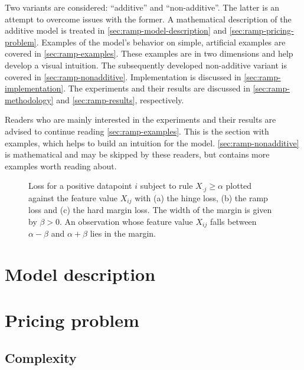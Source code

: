 Two variants are considered: ``additive'' and ``non-additive''.
The latter is an attempt to overcome issues with the former.
A mathematical description of the additive model is treated in
\autoref{sec:ramp-model-description} and \autoref{sec:ramp-pricing-problem}.
Examples of the model's behavior on simple, artificial examples are covered in \autoref{sec:ramp-examples}.
These examples are in two dimensions and help develop a visual intuition.
The subsequently developed non-additive variant is covered in \autoref{sec:ramp-nonadditive}.
Implementation is discussed in \autoref{sec:ramp-implementation}.
The experiments and their results are discussed
in \autoref{sec:ramp-methodology} and \autoref{sec:ramp-results}, respectively.

Readers who are mainly interested in the experiments and their results are advised to continue reading
\autoref{sec:ramp-examples}.
This is the section with examples, which helps to build an intuition for the model.
\autoref{sec:ramp-nonadditive} is mathematical and may be skipped by these readers,
but contains more examples worth reading about.

\begin{figure}
    
    \caption{Loss for a positive datapoint $i$ subject to rule $X_{\cdot j} \geq \alpha$ plotted
    against the feature value $X_{ij}$ with (a) the hinge loss, (b) the ramp loss and (c) the hard margin loss.
    The width of the margin is given by $\beta > 0$.
    An observation whose feature value $X_{ij}$ falls between $\alpha-\beta$ and $\alpha + \beta$ lies in the margin.}
    \label{fig:loss_functions}
\end{figure}


\section{Model description}\label{sec:ramp-model-description}


\section{Pricing problem}\label{sec:ramp-pricing-problem}


\subsection{Complexity}\label{subsec:ramp-pricing-problem-complexity}


